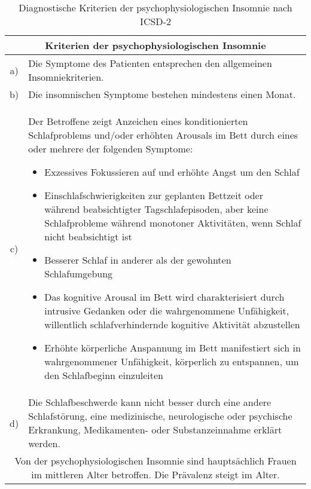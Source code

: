 \begin{table}[H] 
\centering
\begin{tabularx}{\textwidth}{cX}
\toprule
\multicolumn{2}{c}{\textbf{Kriterien der psychophysiologischen Insomnie}}\\
\midrule 
a) & Die Symptome des Patienten entsprechen den allgemeinen Insomniekriterien.\\
b) & Die insomnischen Symptome bestehen mindestens einen Monat.\\
c) & Der Betroffene zeigt Anzeichen eines konditionierten Schlafproblems und/oder erhöhten Arousals im Bett durch eines oder mehrere der folgenden Symptome:
\begin{itemize}
\singlespacing
\setlength\itemsep{0em}
\item Exzessives Fokussieren auf und erhöhte Angst um den Schlaf
\item Einschlafschwierigkeiten zur geplanten Bettzeit oder während beabsichtigter Tagschlafepisoden, aber keine Schlafprobleme während monotoner Aktivitäten, wenn Schlaf nicht beabsichtigt ist
\item Besserer Schlaf in anderer als der gewohnten Schlafumgebung
\item Das kognitive Arousal im Bett wird charakterisiert durch intrusive Gedanken oder die wahrgenommene Unfähigkeit, willentlich schlafverhindernde kognitive Aktivität abzustellen
\item Erhöhte körperliche Anspannung im Bett manifestiert sich in wahrgenommener Unfähigkeit, körperlich zu entspannen, um den Schlafbeginn einzuleiten
\end{itemize}\\
d) & Die Schlafbeschwerde kann nicht besser durch eine andere Schlafstörung, eine medizinische, neurologische oder psychische Erkrankung, Medikamenten- oder Substanzeinnahme erklärt werden.\\
\midrule
\multicolumn{2}{p{0.97\textwidth}}{Von der psychophysiologischen Insomnie sind hauptsächlich Frauen im mittleren Alter betroffen. Die Prävalenz steigt im Alter.}\\
\bottomrule
\end{tabularx}
\caption[Kriterien der psychophysiologischen Insomnie]{Diagnostische Kriterien der psychophysiologischen Insomnie nach \acs{ICSD-2} \parencite{mayer_s3-leitlinie_2009, happe_schlafmedizin_2009}}
\label{tab:psycho_insomnie}
\end{table}



\newpage



